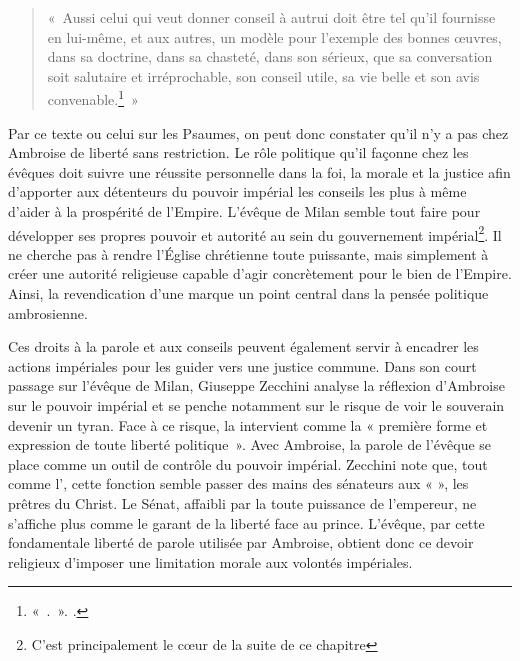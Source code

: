\bigskip

\begin{quote}
    «~Aussi celui qui veut donner conseil à autrui doit être tel qu’il fournisse en lui-même, et aux autres, un modèle pour l’exemple des bonnes œuvres, dans sa doctrine, dans sa chasteté, dans son sérieux, que sa conversation soit salutaire et irréprochable, son conseil utile, sa vie belle et son avis convenable.\footnote{«~.~». \cite[\nopp II, 86]{ambroise_devoirs_2}.}~»
\end{quote}

\bigskip

Par ce texte ou celui sur les Psaumes, on peut donc constater qu'il n'y a pas chez Ambroise de liberté sans restriction. Le rôle politique qu'il façonne chez les évêques doit suivre une réussite personnelle dans la foi, la morale et la justice afin d'apporter aux détenteurs du pouvoir impérial les conseils les plus à même d'aider à la prospérité de l'Empire. L'évêque de Milan semble tout faire pour développer ses propres pouvoir et autorité au sein du gouvernement impérial\footnote{C'est principalement le cœur de la suite de ce chapitre}. Il ne cherche pas à rendre l'Église chrétienne toute puissante, mais simplement à créer une autorité religieuse capable d'agir concrètement pour le bien de l'Empire. Ainsi, la revendication d'une  marque un point central dans la pensée politique ambrosienne.

\bigskip

Ces droits à la parole et aux conseils peuvent également servir à encadrer les actions impériales pour les guider vers une justice commune. Dans son court passage sur l'évêque de Milan, Giuseppe Zecchini analyse la réflexion d'Ambroise sur le pouvoir impérial et se penche notamment sur le risque de voir le souverain devenir un tyran. Face à ce risque, la  intervient comme la « première forme et expression de toute liberté politique\autocite[165]{zecchini_pensiero_politico}~». Avec Ambroise, la parole de l'évêque se place comme un outil de contrôle du pouvoir impérial. Zecchini note que, tout comme l', cette fonction semble passer des mains des sénateurs aux «  », les prêtres du Christ. Le Sénat, affaibli par la toute puissance de l'empereur, ne s'affiche plus comme le garant de la liberté face au prince. L'évêque, par cette fondamentale liberté de parole utilisée par Ambroise, obtient donc ce devoir religieux d'imposer une limitation morale aux volontés impériales.

